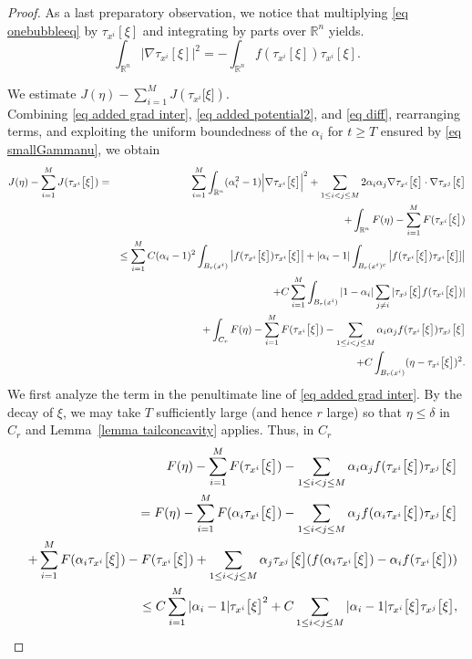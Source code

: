 \documentclass[11pt,letterpaper,reqno]{amsart}
\newcommand{\R}{\mathbb{R}}
\theoremstyle{plain}%
\theoremstyle{definition}
\numberwithin{equation}{section}
\numberwithin{figure}{section}
\begin{document}
\begin{proof}
As a last preparatory observation, we notice that multiplying \eqref{eq onebubbleeq} by $\tau_{x^i}[\xi]$ and integrating by parts over $\mathbb{R}^n$ yields.
\begin{equation}\label{eq diff}
\int_{\mathbb{R}^n} \big|\nabla \tau_{x^i}[\xi]\big|^2
= - \int_{\mathbb{R}^n}
f(\tau_{x^i}[\xi]) \tau_{x^i}[\xi].
\end{equation}

\medskip

 We estimate $J(\eta)-\sum_{i=1}^M J(\tau_{x^i}\big[\xi\big])$.\\

Combining \eqref{eq added grad inter}, \eqref{eq added potential2}, and \eqref{eq diff}, rearranging terms, and exploiting the uniform boundedness of the $\alpha_i$ for $t\ge T$ ensured by \eqref{eq smallGammanu}, we obtain \begin{eqnarray}\notag 
J(\eta)-\sum_{i=1}^M J(\tau_{x^i}\big[\xi\big])&=& \sum_{i=1}^M\int_{\R^n}(\alpha_i^2-1)\Big|\nabla\tau_{x^i}\big[\xi\big]\Big|^2 +\sum_{1\leq i < j \leq M}2 \alpha_i \alpha_j \nabla\tau_{x^i}\big[\xi\big]\cdot \nabla \tau_{x^j}\big[\xi\big]\\\notag
&& +\int_{\R^n}F (\eta)- \sum_{i=1}^M F(\tau_{x^i}\big[\xi\big])\\\notag && \leq \sum_{i=1}^M C(\alpha_i-1)^2\int_{B_r(x^i)} \big|f (\tau_{x^i}\big[\xi\big])\tau_{x^i}\big[\xi\big]\big|+ |\alpha_i-1| \int_{B_r(x^i)^c} \big|f (\tau_{x^i}\big[\xi\big])\tau_{x^i}\big[\xi\big] ]\big| \\\notag &&+ C\sum_{i=1}^M \int_{B_r(x^i)} |1-\alpha_i| \sum_{j\neq i} | \tau_{x^j}\big[\xi\big] f (\tau_{x^i}\big[\xi\big])|\\ \notag && + \int_{C_r} F (\eta)- \sum_{i=1}^M F(\tau_{x^i}\big[\xi\big])- \sum_{1\leq i < j \leq M} \alpha_i \alpha_j f(\tau_{x^i}\big[\xi\big]) \tau_{x^j}\big[\xi\big]\\ \label{eq added grad inter} &&+ C\int_{B_r(x^i)} (\eta-\tau_{x^i}\big[\xi\big])^2. \end{eqnarray}
We first analyze the term in the penultimate line of \eqref{eq added grad inter}. 
By the decay of $\xi$, we may take $T$ sufficiently large (and hence $r$ large) so that $\eta \le \delta$ in $C_{r}$ and Lemma~\ref{lemma tailconcavity} applies. Thus, in $C_r$
\begin{eqnarray}\notag &&F (\eta)- \sum_{i=1}^M F(\tau_{x^i}\big[\xi\big])- \sum_{1\leq i < j \leq M} \alpha_i \alpha_j f(\tau_{x^i}\big[\xi\big]) \tau_{x^j}\big[\xi\big]\\\notag &&= F (\eta)- \sum_{i=1}^M F(\alpha_i\tau_{x^i}\big[\xi\big]) -\sum_{1\leq i < j \leq M} \alpha_j f(\alpha_i\tau_{x^i}\big[\xi\big]) \tau_{x^j}\big[\xi\big]\\\notag && + \sum_{i=1}^M F(\alpha_i\tau_{x^i}\big[\xi\big])-F(\tau_{x^i}\big[\xi\big]) + \sum_{1\leq i < j \leq M} \alpha_j \tau_{x^j}\big[\xi\big](f(\alpha_i\tau_{x^i}\big[\xi\big])-\alpha_i f(\tau_{x^i}\big[\xi\big]))\\\label{eq tailF} && \leq C\sum_{i=1}^M |\alpha_i-1|\tau_{x^i}\big[\xi\big]^2+C\sum_{1\leq i < j \leq M} |\alpha_i-1|\tau_{x^i}\big[\xi\big]\tau_{x^j}\big[\xi\big], \end{eqnarray} 

\end{proof}
\end{document}
